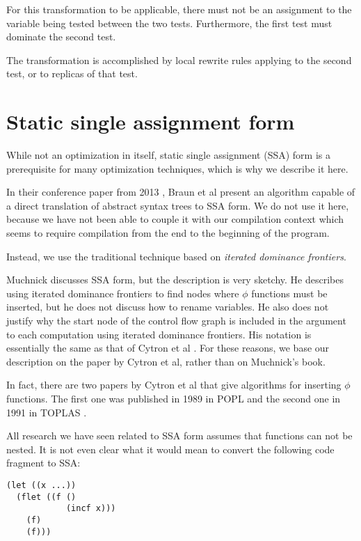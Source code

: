 For this transformation to be applicable, there must not be an
assignment to the variable being tested between the two tests.
Furthermore, the first test must dominate the second test.

The transformation is accomplished by local rewrite rules applying to
the second test, or to replicas of that test.

\section{Static single assignment form}
\label{mir-optimizations-ssa-form}

While not an optimization in itself, static single assignment (SSA)
form is a prerequisite for many optimization techniques, which is why
we describe it here. 

In their conference paper from 2013
\cite{Braun:2013:SEC:2450247.2450258}, Braun et al present an
algorithm capable of a direct translation of abstract syntax trees to
SSA form.  We do not use it here, because we have not been able to
couple it with our compilation context which seems to require
compilation from the end to the beginning of the program. 

Instead, we use the traditional technique based on \emph{iterated
  dominance frontiers}.

Muchnick \cite{Muchnick:1998:ACD:286076} discusses SSA form, but the
description is very sketchy.  He describes using iterated dominance
frontiers to find nodes where $\phi$ functions must be inserted, but
he does not discuss how to rename variables.  He also does not justify
why the start node of the control flow graph is included in the
argument to each computation using iterated dominance frontiers.  His
notation is essentially the same as that of Cytron et al
\cite{Cytron:1991:ECS:115372.115320}.  For these reasons, we base our
description on the paper by Cytron et al, rather than on Muchnick's
book.

In fact, there are two papers by Cytron et al that give algorithms for
inserting $\phi$ functions.  The first one was published in 1989 in
POPL \cite{Cytron:1989:EMC:75277.75280} and the second one in 1991 in
TOPLAS \cite{Cytron:1991:ECS:115372.115320}.

All research we have seen related to SSA form assumes that functions
can not be nested.  It is not even clear what it would mean to convert
the following code fragment to SSA:

\begin{verbatim}
(let ((x ...))
  (flet ((f ()
            (incf x)))
    (f)
    (f)))
\end{verbatim}


